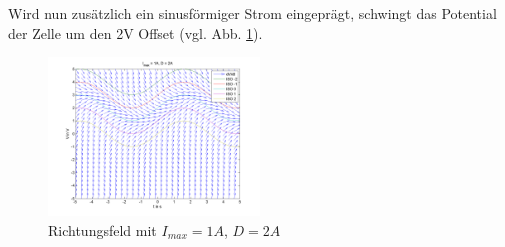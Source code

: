 \documentclass[conference]{IEEEtran}
\begin{document}
Wird nun zusätzlich ein sinusförmiger Strom eingeprägt, schwingt das Potential der Zelle um den 2V Offset (vgl. Abb. \ref{fig:slope4}).
\begin{figure}[h!]
	\centering
	\includegraphics[width=0.5\textwidth]{img/slopefield4.png}
	\caption{Richtungsfeld mit $I_{max}=1A$, $D=2A$}
	\label{fig:slope4}
\end{figure}
\end{document}
